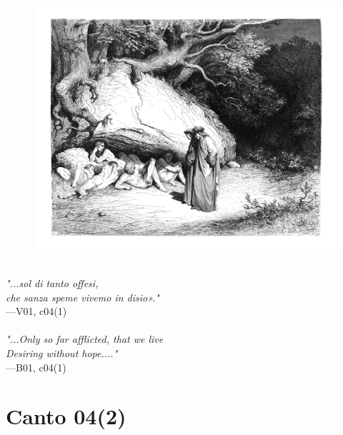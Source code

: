 \documentclass[../Dore_vision.tex]{subfiles}
\begin{document}
\begin{figure}[ht]
\centering
\includegraphics[height=\figsize]{illustrations/book_1/V01, c04(1).jpg}
\end{figure}

\begin{center}
\begin{minipage}{0.8\linewidth}
\textit{\\
"...sol di tanto offesi,\\che sanza speme vivemo in disio»."} \\
—V01, c04(1) \\~\\
\textit{"...Only so far afflicted, that we live\\Desiring without hope.\textquotesingle..."} \\
—B01, c04(1)
\end{minipage}
\end{center}

\newpage

\section{Canto 04(2)}
\end{document}
